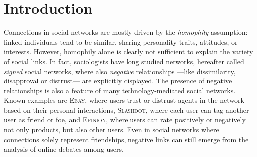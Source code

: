 


\section{Introduction}
%
Connections in social networks are mostly driven by the {\em homophily} assumption: linked individuals tend to be similar, sharing personality traits, attitudes, or interests. However, homophily alone is clearly not sufficient to explain the variety of social links. In fact, sociologists have long studied networks, hereafter called \emph{signed} social networks, where also {\em negative} relationships ---like dissimilarity, disapproval or distrust--- are explicitly displayed. The presence of negative relationships is also a feature of many technology-mediated social networks. Known examples are \textsc{Ebay}, where users trust or distrust agents in the network based on their personal interactions, \textsc{Slashdot}, where each user can tag another user as friend or foe, and \textsc{Epinion}, where users can rate positively or negatively not only products, but also other users. Even in social networks where connections solely represent friendships, negative links can still emerge from the analysis of online debates among users.



